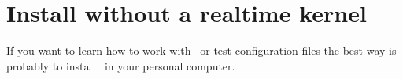 \section{Install without a realtime kernel}
\label{install:nokernel}
If you want to learn how to work with \progname\ or test configuration files the best way is probably to install \progname\ in your personal computer.
